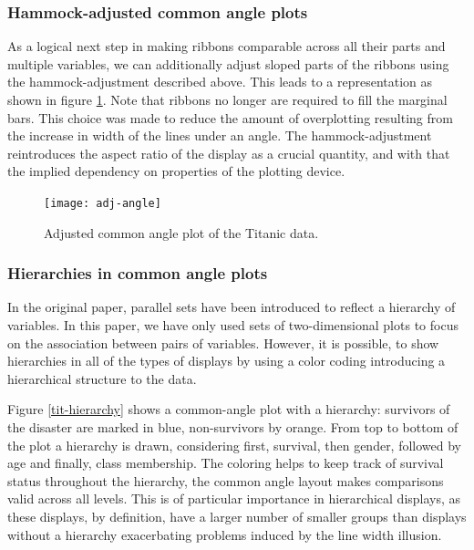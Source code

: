 \subsubsection{Hammock-adjusted common angle plots}
As a logical next step in making ribbons comparable across all their parts and multiple variables, we can additionally adjust sloped parts of the ribbons using the hammock-adjustment described above. This leads to a representation as shown in figure \ref{adj.angle}. Note that ribbons no longer are required to fill the marginal bars. This choice was made to reduce the amount of overplotting resulting from the increase in width of the lines under an angle. The hammock-adjustment reintroduces the aspect ratio of the display as a crucial quantity, and with that the implied dependency on  properties of the plotting device. 
\begin{figure}[hbtp]
\texttt{[image: adj-angle]}
\caption{\label{adj.angle} Adjusted common angle plot of the Titanic data.}
\end{figure}

\subsubsection{Hierarchies in common angle plots}\label{sec:hierarchy}
In the original paper, parallel sets have been introduced to reflect a hierarchy of variables. In this paper, we have only used  sets of two-dimensional plots to focus on the association between pairs of variables. 
However, it is possible, to show hierarchies in all of the types of displays by using a color coding introducing a hierarchical structure to the data. 

Figure \ref{tit-hierarchy}
shows a common-angle plot  with a hierarchy: survivors of the disaster are marked in blue, non-survivors by orange. From top to bottom of the plot a hierarchy is drawn, considering first, survival, then gender, followed by age and finally, class membership. The coloring helps to keep track of survival status throughout the hierarchy, the common angle layout makes comparisons valid across all levels. This is of particular importance in hierarchical displays, as these displays, by definition, have a larger number of smaller groups than displays without a hierarchy exacerbating problems induced by the line width illusion.

